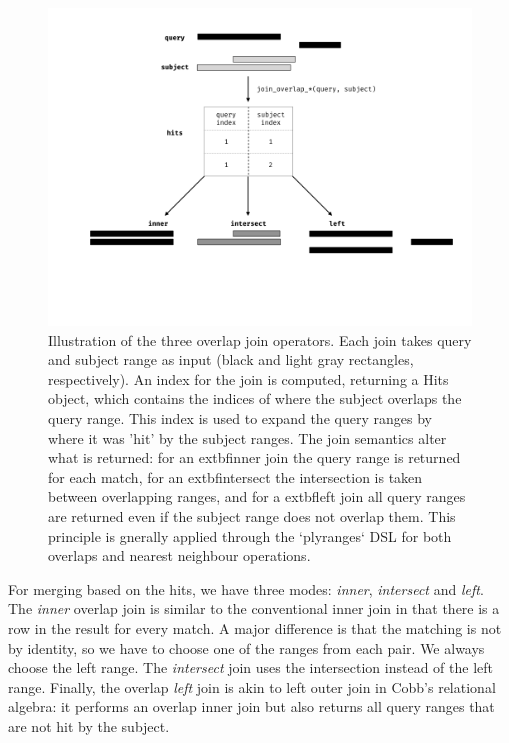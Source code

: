 \documentclass[10pt,letterpaper]{article}
\begin{document}
\begin{figure}

{\centering \includegraphics[width=400pt]{diagrams/diagrams-002} 

}

\caption{Illustration of the three overlap join operators. Each join takes query and subject range as input (black and light gray rectangles, respectively). An index for the join is computed, returning a Hits object, which contains the indices of where the subject overlaps the query range. This index is used to expand the query ranges by where it was 'hit' by the subject ranges. The join semantics alter what is returned: for an     extbf{inner} join the query range is returned for each match, for an    extbf{intersect} the intersection is taken between overlapping ranges, and for a    extbf{left} join all query ranges are returned even if the subject range does not overlap them. This principle is gnerally applied through the `plyranges` DSL for both overlaps and nearest neighbour operations.}\label{fig:olaps-fig}
\end{figure}

For merging based on the hits, we have three modes: \emph{inner},
\emph{intersect} and \emph{left}. The \emph{inner} overlap join is
similar to the conventional inner join in that there is a row in the
result for every match. A major difference is that the matching is not
by identity, so we have to choose one of the ranges from each pair. We
always choose the left range. The \emph{intersect} join uses the
intersection instead of the left range. Finally, the overlap \emph{left}
join is akin to left outer join in Cobb's relational algebra: it
performs an overlap inner join but also returns all query ranges that
are not hit by the subject.
\end{document}

